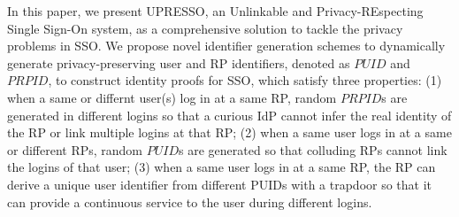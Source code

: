 \begin{comment}


Moreover, BrowserID and SPRESSO are both redesigns of SSO systems, and therefore incompatible with existing widely deployed SSO systems (e.g., OAuth, OIDC and SAML). The new SSO systems require a complicated, formal and thorough security analysis of both the designs and various implementations. As shown in~\cite{BrowserID, browseridfett2014, gilbert2013formal}, vulnerabilities have been found in the implementation of BrowserID.
\end{comment}

In this paper, we present UPRESSO, an Unlinkable and Privacy-REspecting Single Sign-On system,
as a comprehensive solution to tackle the privacy problems in SSO. We propose novel identifier generation schemes to dynamically generate  privacy-preserving user and RP identifiers, denoted as $PUID$ and $PRPID$, to construct identity proofs for SSO, which satisfy three properties: (1) when a same or differnt user(s) log in at a same RP, random $PRPID$s are generated in different logins so that a curious IdP cannot infer the real identity of the RP or link multiple logins at that RP; (2) when a same user logs in at a same or different RPs, random $PUID$s are generated so that
 colluding RPs cannot link the logins of that user; (3) when a same user logs in at a same RP, the RP can derive a unique user identifier from different PUIDs with a trapdoor so that it can provide a continuous service to the user during different logins.

